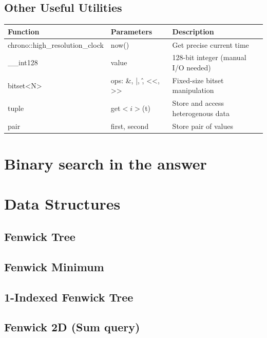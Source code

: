 \documentclass[10pt]{article}
\begin{document}
\begin{multicols*}{2}
\subsection*{Other Useful Utilities}
\begin{tabularx}{\linewidth}{|l|l|X|}
    \hline
    \textbf{Function} & \textbf{Parameters} & \textbf{Description} \\
    \hline
    chrono::high\_resolution\_clock & now() & Get precise current time \\
    \hline
    \_\_int128 & value & 128-bit integer (manual I/O needed) \\
    \hline
    bitset<N> & ops: \&, |, \^, <<, >> & Fixed-size bitset manipulation \\
    \hline
    tuple & get$<i>$(t) & Store and access heterogenous data \\
    \hline
    pair & first, second & Store pair of values \\
    \hline
\end{tabularx}


\section{Binary search in the answer}

\section{Data Structures}
\subsection{Fenwick Tree}


\subsection{Fenwick Minimum}


\subsection{1-Indexed Fenwick Tree}


\subsection{Fenwick 2D (Sum query)}



\end{multicols*}
\end{document}

